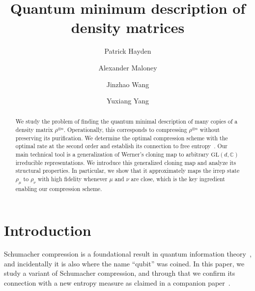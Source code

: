 \documentclass[a4paper,onecolumn,11pt]{quantumarticle}
\begin{document}
\title{Quantum minimum description of density matrices}

\author{Patrick Hayden}

\author{Alexander Maloney}

\author{Jinzhao Wang}

\author{Yuxiang Yang}
 
\maketitle

\begin{abstract}
We study the problem of finding the quantum minimal description of many copies of a density matrix $\rho^{\otimes n}$. Operationally, this corresponds to compressing $\rho^{\otimes n}$ without preserving its purification. We determine the optimal compression scheme with the optimal rate at the second order and establish its connection to free entropy~\cite{paper1}. 
Our main technical tool is a generalization of Werner’s cloning map to arbitrary $\mathrm{GL}(d,\mathbb C)$ irreducible representations. We introduce this generalized cloning map and analyze its structural properties. In particular, we show that it approximately maps the irrep state $\rho_\mu$ to $\rho_\nu$ with high fidelity whenever $\mu$ and $\nu$ are close, which is the key ingredient enabling our compression scheme.
\end{abstract}


\section{Introduction}\label{sec:intro}

Schumacher compression is a foundational result in quantum information theory~\cite{schumacher1995quantum}, and incidentally it is also where the name ``qubit'' was coined. In this paper, we study a variant of Schumacher compression, and through that we confirm its connection with a new entropy measure as claimed in a companion paper~\cite{paper1}. 
\end{document}
